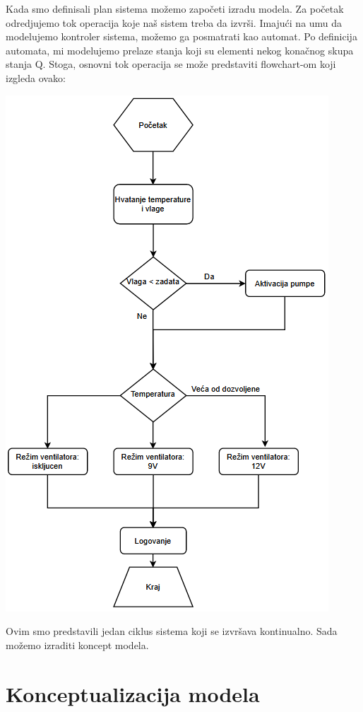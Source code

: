 \documentclass[a4paper,11pt]{book}
\begin{document}
Kada smo definisali plan sistema možemo započeti izradu modela. Za početak odredjujemo tok operacija koje naš sistem treba da izvrši. Imajući na umu da modelujemo kontroler sistema, možemo ga posmatrati kao automat. Po definicija automata, mi modelujemo prelaze stanja koji su elementi nekog konačnog skupa stanja Q. Stoga, osnovni tok operacija se može predstaviti flowchart-om koji izgleda ovako:

\includegraphics[width=\textwidth]{flow.png}

Ovim smo predstavili jedan ciklus sistema koji se izvršava kontinualno. Sada možemo izraditi koncept modela.

\section{Konceptualizacija modela}
\end{document}
